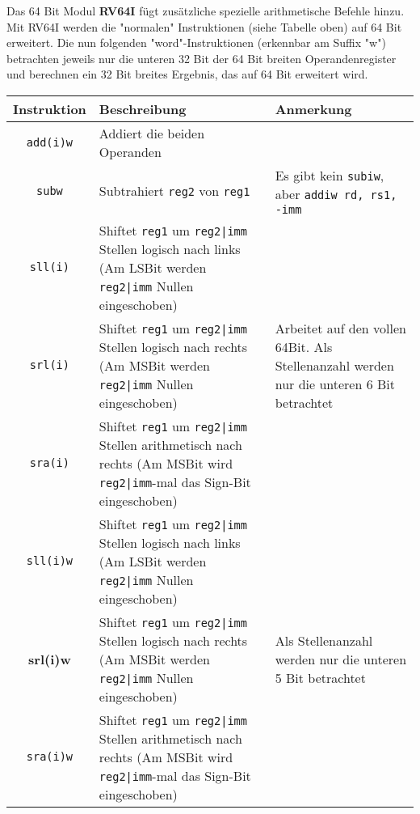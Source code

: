 Das 64 Bit Modul \textbf{RV64I} fügt zusätzliche spezielle arithmetische Befehle
hinzu. Mit RV64I werden die "normalen" Instruktionen (siehe Tabelle oben) auf 64
Bit erweitert. Die nun folgenden "word"-Instruktionen (erkennbar am Suffix "w")
betrachten jeweils nur die unteren 32 Bit der 64 Bit breiten Operandenregister
und berechnen ein 32 Bit breites Ergebnis, das auf 64 Bit erweitert wird.

\begin{table}[H]
  \begin{tabular}{c p{8cm} p{4cm}}
    \textbf{Instruktion} & \textbf{Beschreibung} & \textbf{Anmerkung}\\
    \toprule

  	\texttt{add(i)w} & Addiert die beiden Operanden & \\

  	\texttt{subw} & Subtrahiert \texttt{reg2} von \texttt{reg1}& Es gibt kein
  	\texttt{subiw}, aber \texttt{addiw rd, rs1, -imm} \\

  	\texttt{sll(i)} & Shiftet \texttt{reg1} um \texttt{reg2|imm} Stellen logisch
  	nach links (Am LSBit werden \texttt{reg2|imm} Nullen eingeschoben) &
  	\multirow{3}{4cm}{Arbeitet auf den vollen 64Bit. Als Stellenanzahl werden
  	nur die unteren 6 Bit betrachtet} \\ \midrule

  	\texttt{srl(i)} & Shiftet \texttt{reg1} um \texttt{reg2|imm} Stellen logisch
  	nach rechts (Am MSBit werden \texttt{reg2|imm} Nullen eingeschoben) & \\
  	\midrule

  	\texttt{sra(i)} & Shiftet \texttt{reg1} um \texttt{reg2|imm} Stellen
  	arithmetisch nach rechts (Am MSBit wird \texttt{reg2|imm}-mal das Sign-Bit
  	eingeschoben) & \\

  	\texttt{sll(i)w} & Shiftet \texttt{reg1} um \texttt{reg2|imm} Stellen
  	logisch nach links (Am LSBit werden \texttt{reg2|imm} Nullen eingeschoben) &
  	\multirow{3}{4cm}{Als Stellenanzahl werden nur die unteren 5 Bit betrachtet} \\
  	\midrule

  	\textbf{srl(i)w} & Shiftet \texttt{reg1} um \texttt{reg2|imm} Stellen
  	logisch nach rechts (Am MSBit werden \texttt{reg2|imm} Nullen eingeschoben) & \\
  	\midrule

  	\texttt{sra(i)w} & Shiftet \texttt{reg1} um \texttt{reg2|imm} Stellen
  	arithmetisch nach rechts (Am MSBit wird \texttt{reg2|imm}-mal das Sign-Bit
  	eingeschoben) & \\

  \end{tabular}
\end{table}

